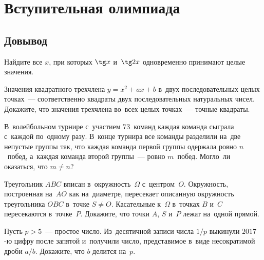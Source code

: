 
\section*{Вступительная олимпиада}


\subsection*{Довывод}

\begin{problems}

\item
Найдите все $x$, при которых $\tg x$ и~$\tg 2x$ одновременно принимают целые
значения.

\item
Значения квадратного трехчлена $y = x^2 + ax + b$ в~двух последовательных целых
точках~--- соответственно квадраты двух последовательных натуральных чисел.
Докажите, что значения трехчлена во~всех целых точках~--- точные квадраты.

\item
В~волейбольном турнире с~участием $73$~команд каждая команда сыграла с~каждой
по~одному разу.
В~конце турнира все команды разделили на~две непустые группы так, что
каждая команда первой группы одержала ровно $n$~побед,
а~каждая команда второй группы~--- ровно $m$~побед.
Могло~ли оказаться, что $m \neq n$?

\item
Треугольник $ABC$ вписан в~окружность~$\Omega$ с~центром~$O$.
Окружность, построенная на~$AO$ как на~диаметре, пересекает описанную
окружность треугольника $OBC$ в~точке $S \neq O$.
Касательные к~$\Omega$ в~точках $B$ и~$C$ пересекаются в~точке~$P$.
Докажите, что точки $A$, $S$ и~$P$ лежат на~одной прямой.

\item
Пусть $p > 5$~--- простое число.
Из~десятичной записи числа $1 / p$ выкинули $2017$-ю цифру после запятой
и~получили число, представимое в~виде несократимой дроби $a / b$.
Докажите, что $b$ делится на~$p$.

\end{problems}

